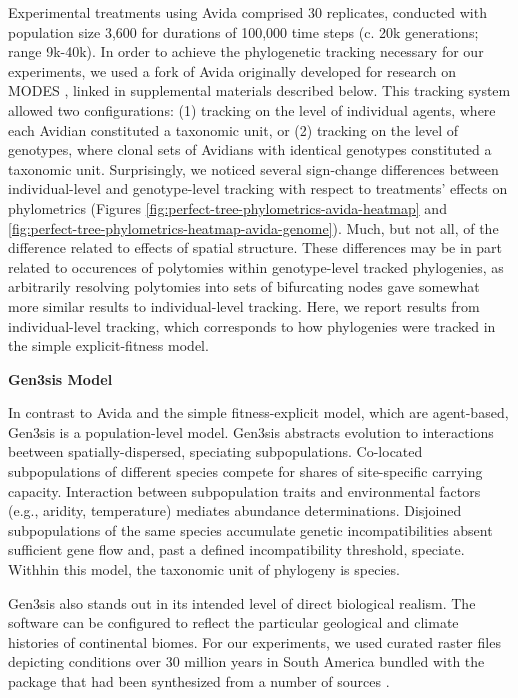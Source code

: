 Experimental treatments using Avida comprised 30 replicates, conducted with population size 3,600 for durations of 100,000 time steps (c. 20k generations; range 9k-40k).
In order to achieve the phylogenetic tracking necessary for our experiments, we used a fork of Avida originally developed for research on MODES \citep{dolsonMODESToolboxMeasurements2019}, linked in supplemental materials described below.
This tracking system allowed two configurations: (1) tracking on the level of individual agents, where each Avidian constituted a taxonomic unit, or (2) tracking on the level of genotypes, where clonal sets of Avidians with identical genotypes constituted a taxonomic unit.
Surprisingly, we noticed several sign-change differences between individual-level and genotype-level tracking with respect to treatments' effects on phylometrics (Figures \ref{fig:perfect-tree-phylometrics-avida-heatmap} and \ref{fig:perfect-tree-phylometrics-heatmap-avida-genome}).
Much, but not all, of the difference related to effects of spatial structure.
These differences may be in part related to occurences of polytomies within genotype-level tracked phylogenies, as arbitrarily resolving polytomies into sets of bifurcating nodes gave somewhat more similar results to individual-level tracking.
Here, we report results from individual-level tracking, which corresponds to how phylogenies were tracked in the simple explicit-fitness model.

\textbf{Gen3sis Model}

In contrast to Avida and the simple fitness-explicit model, which are agent-based, Gen3sis is a population-level model.
Gen3sis abstracts evolution to interactions beetween spatially-dispersed, speciating subpopulations.
Co-located subpopulations of different species compete for shares of site-specific carrying capacity.
Interaction between subpopulation traits and environmental factors (e.g., aridity, temperature) mediates abundance determinations.
Disjoined subpopulations of the same species accumulate genetic incompatibilities absent sufficient gene flow and, past a defined incompatibility threshold, speciate.
Withhin this model, the taxonomic unit of phylogeny is species.

Gen3sis also stands out in its intended level of direct biological realism.
The software can be configured to reflect the particular geological and climate histories of continental biomes.
For our experiments, we used curated raster files depicting conditions over 30 million years in South America bundled with the package that had been synthesized from a number of sources \citep{straume2020global,westerhold2020astronomically,fick2017worldclim,hagen2019mountain,annan2013new,cramwinckel2018synchronous,evans2018eocene,hollis2019deepmip,hutchinson2018climate,keating2011warm,sijp2014role,zhang2019evolution}.

